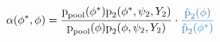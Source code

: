 \begin{equation*}
  \alpha (\phi^{*}, \phi) = 
  \frac {
    \pd_{\text{pool}} (\phi^{*})
    \pd_{2}(\phi^{*}, \psi_{2}, Y_{2})
  } {
    \pd_{\text{pool}} (\phi)
    \pd_{2}(\phi, \psi_{2}, Y_{2})
  }
  \cdot
  \textcolor{mymidblue}{
    \frac {
      \hat{\pd}_{2}(\phi)
    } {
      \hat{\pd}_{2}(\phi^{*})
    }
  }
\end{equation*}
